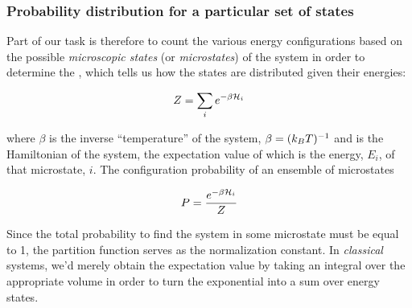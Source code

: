 \documentclass[hyperref={colorlinks=true}]{beamer}
\begin{document}
\begin{frame}%
  \frametitle{Probability distribution for a particular set of states}

  Part of our task is therefore to count the various energy configurations based on the possible \textit{microscopic states} (or \textit{microstates}) of the system in order to determine the , which tells us how the states are distributed given their energies:
  
  \pause
  
  \begin{equation}
    Z = \sum_i e^{-\beta \mathcal{H}_i}
  \end{equation}

  where $\beta$ is the inverse ``temperature'' of the system, $\beta = (k_B T)^{-1}$ and \Ham is the Hamiltonian of the system, the expectation value of which is the energy, $E_i$, of that microstate, $i$. \pause The configuration probability of an ensemble of microstates 
  
  \begin{equation}
    P = \frac{e^{-\beta \mathcal{H}_i}}{Z}
  \end{equation}

  \pause

  Since the total probability to find the system in some microstate must be equal to 1, the partition function serves as the normalization constant. In \textit{classical} systems, we'd merely obtain the expectation value by taking an integral over the appropriate volume in order to turn the exponential into a sum over energy states.

\end{frame}
\end{document}
